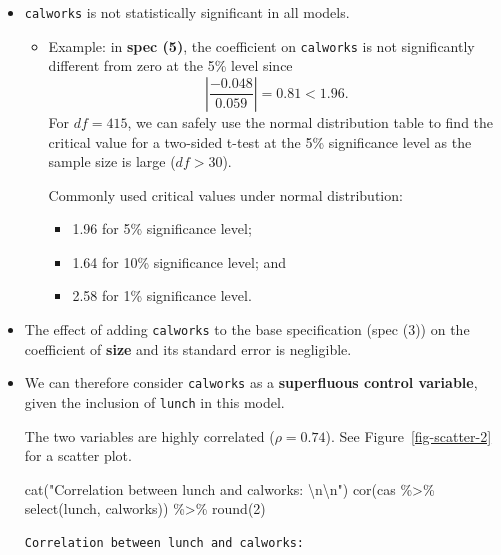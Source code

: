 \documentclass[
  12pt,
  letterpaper,
]{scrbook}
\newenvironment{Shaded}{\begin{snugshade}}{\end{snugshade}}
\newcommand{\DecValTok}[1]{\textcolor[rgb]{0.68,0.00,0.00}{#1}}
\newcommand{\FunctionTok}[1]{\textcolor[rgb]{0.28,0.35,0.67}{#1}}
\newcommand{\NormalTok}[1]{\textcolor[rgb]{0.00,0.23,0.31}{#1}}
\newcommand{\SpecialCharTok}[1]{\textcolor[rgb]{0.37,0.37,0.37}{#1}}
\newcommand{\StringTok}[1]{\textcolor[rgb]{0.13,0.47,0.30}{#1}}
\providecommand{\tightlist}{%
  \setlength{\itemsep}{0pt}\setlength{\parskip}{0pt}}
\renewcommand{\tightlist}{\setlength{\itemsep}{0.5\baselineskip}\setlength{\parskip}{0.2\baselineskip}}
\theoremstyle{plain}
\theoremstyle{definition}
\theoremstyle{remark}
\begin{document}
\begin{itemize}
\item
  \texttt{calworks} is not statistically significant in all models.

  \begin{itemize}
  \item
    Example: in \textbf{spec (5)}, the coefficient on \texttt{calworks}
    is not significantly different from zero at the 5\% level since \[
    \left|\frac{-0.048}{0.059}\right| = 0.81 < 1.96.
    \] For \(df = 415\), we can safely use the normal distribution table
    to find the critical value for a two-sided t-test at the 5\%
    significance level as the sample size is large (\(df>30\)).

    Commonly used critical values under normal distribution:

    \begin{itemize}
    \tightlist
    \item
      {1.96 for 5\% significance level;}
    \item
      1.64 for 10\% significance level; and
    \item
      2.58 for 1\% significance level.
    \end{itemize}
  \end{itemize}
\item
  The effect of adding \texttt{calworks} to the base specification (spec
  (3)) on the coefficient of \textbf{size} and its standard error is
  negligible.
\item
  We can therefore consider \texttt{calworks} as a \textbf{superfluous
  control variable}, given the inclusion of \texttt{lunch} in this
  model.

  The two variables are highly correlated (\(\rho = 0.74\)). See
  Figure~\ref{fig-scatter-2} for a scatter plot.

\begin{Shaded}
\begin{Highlighting}[]
\FunctionTok{cat}\NormalTok{(}\StringTok{"Correlation between lunch and calworks: }\SpecialCharTok{\textbackslash{}n\textbackslash{}n}\StringTok{"}\NormalTok{)}
\FunctionTok{cor}\NormalTok{(cas }\SpecialCharTok{\%\textgreater{}\%} \FunctionTok{select}\NormalTok{(lunch, calworks)) }\SpecialCharTok{\%\textgreater{}\%} \FunctionTok{round}\NormalTok{(}\DecValTok{2}\NormalTok{)}
\end{Highlighting}
\end{Shaded}

\begin{verbatim}
Correlation between lunch and calworks: 


\end{verbatim}
\end{itemize}
\end{document}
